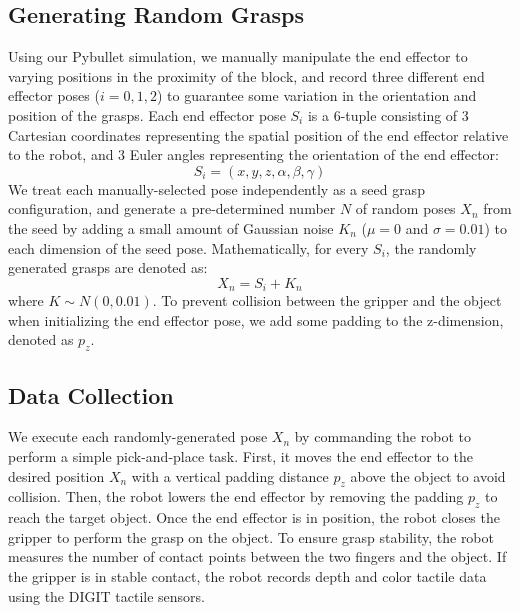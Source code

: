 \documentclass[11pt, a4paper]{report}
\theoremstyle{definition}
\begin{document}
\subsection{Generating Random Grasps}
\label{sec:4.1.1}
Using our Pybullet simulation, we manually manipulate the end effector to varying positions in the proximity of the block, and record three different end effector poses ($i=0,1,2$) to guarantee some variation in the orientation and position of the grasps. Each end effector pose $S_i$ is a 6-tuple consisting of 3 Cartesian coordinates representing the spatial position of the end effector relative to the robot, and 3 Euler angles representing the orientation of the end effector:
\begin{equation}
    S_i=(x,y,z,\alpha,\beta,\gamma)
\end{equation}
We treat each manually-selected pose independently as a seed grasp configuration, and generate a pre-determined number $N$ of random poses $X_n$ from the seed by adding a small amount of Gaussian noise $K_n$ ($\mu=0$ and $\sigma=0.01$) to each dimension of the seed pose. Mathematically, for every $S_i$, the randomly generated grasps are denoted as:
\begin{equation}
    X_n=S_i+K_n
\end{equation}
where $K\sim N(0,0.01)$. To prevent collision between the gripper and the object when initializing the end effector pose, we add some padding to the z-dimension, denoted as $p_z$.

\subsection{Data Collection}
\label{sec:4.1.2}
We execute each randomly-generated pose $X_n$ by commanding the robot to perform a simple pick-and-place task. First, it moves the end effector to the desired position $X_n$ with a vertical padding distance $p_z$ above the object to avoid collision. Then, the robot lowers the end effector by removing the padding $p_z$ to reach the target object. Once the end effector is in position, the robot closes the gripper to perform the grasp on the object. To ensure grasp stability, the robot measures the number of contact points between the two fingers and the object. If the gripper is in stable contact, the robot records depth and color tactile data using the DIGIT tactile sensors.\\
\end{document}
